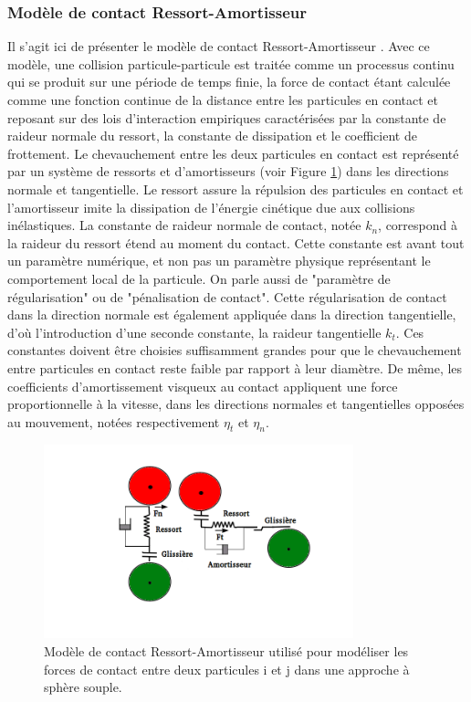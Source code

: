 \subsubsection{Modèle de contact Ressort-Amortisseur}

 Il s'agit ici de présenter le modèle de contact Ressort-Amortisseur \cite{hu2010determination}. Avec ce modèle, une collision particule-particule est traitée comme un processus continu qui se produit sur une période de temps finie, la force de contact étant calculée comme une fonction continue de la distance entre les particules en contact et reposant sur des lois d'interaction empiriques caractérisées par la constante de raideur normale du ressort, la constante de dissipation et le coefficient de frottement. Le chevauchement entre les deux particules en contact est représenté par un système de ressorts et d'amortisseurs (voir Figure \ref{fig2}) dans les directions normale et tangentielle. Le ressort assure la répulsion des particules en contact et l'amortisseur imite la dissipation de l'énergie cinétique due aux collisions inélastiques. La constante de raideur normale de contact, notée $k_n$, correspond à la raideur du ressort étend au moment du contact. Cette constante est avant tout un paramètre numérique, et non pas un paramètre physique représentant le comportement local de la particule. On parle aussi de "paramètre de régularisation" ou de "pénalisation de contact". Cette régularisation de contact dans la direction normale est également appliquée dans la direction tangentielle, d'où l'introduction d'une seconde constante, la raideur tangentielle $k_t$. Ces constantes doivent être choisies suffisamment grandes pour que le chevauchement entre particules en contact reste faible par rapport à leur diamètre. De même, les coefficients d'amortissement visqueux au contact appliquent une force proportionnelle à la vitesse, dans les directions normales et tangentielles opposées au mouvement, notées respectivement $\eta_{t}$ et $\eta_{n}$. 

\begin{figure}[!h]
        \centering
        \includegraphics[width=0.8\textwidth]{chapitres/chapitre_4/figures/schematic_spring_dashpot.png}
        \caption{Modèle de contact Ressort-Amortisseur utilisé pour modéliser les forces de contact entre deux particules i et j dans une approche à sphère souple.}
        \label{fig2}    
    \end{figure}

